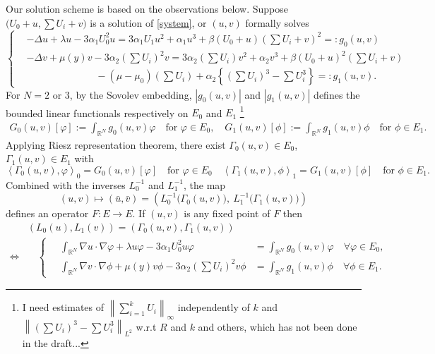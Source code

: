 \documentclass[a4paper,11pt]{article}
\def\red{\color{red}}
\def\red{\color{red}}
\numberwithin{step}{dummy}
\begin{document}
Our solution scheme is based on the observations below. Suppose $\big(U_0 +u, \sum U_i + v\big)$ is a solution of \eqref{system}, or $(u,v)$ formally solves
\begin{equation*}
 \left\{
 \begin{aligned}
 &-\Delta u + \lambda u - 3\alpha_1U_0^2 u = 3\alpha_1U_1 u^2 + \alpha_1u^3 + \beta(U_0+u)\left(\sum U_i +v\right)^2=:g_0(u,v)\\
 &-\Delta v + \mu(y) v - 3\alpha_2\left(\sum U_i\right)^2 v = 3\alpha_2\left(\sum U_i\right)v^2 + \alpha_2v^3 + \beta\left(U_0 +u\right)^2\left(\sum U_i +v\right)  \\
 & \quad \quad \quad \quad \quad \quad \quad - (\mu-\mu_0)\left(\sum U_i\right)+ \alpha_2\left\{ \left(\sum U_i\right)^3 - \sum U_i^3 \right\} =:g_1(u,v).
 \end{aligned}
 \right.
\end{equation*}
For $N=2$ or $3$, by the Sovolev embedding, $|g_0(u,v)|$ and $|g_1(u,v)|$ defines the bounded linear functionals respectively on $E_0$ and $E_1$ \footnote{\red I need estimates of $\displaystyle\left\|\sum_{i=1}^k U_i\right\|_\infty$ independently of $k$ and $\left\| \left(\sum U_i\right)^3 - \sum U_i^3 \right\|_{L^2}$ w.r.t $R$ and $k$ and others, which has not been done in the draft...}
\begin{align*}
 G_0(u,v)[\varphi]:=\int_{ \mathbb{R}^N} g_0(u,v)\varphi \quad \text{for $\varphi \in E_0$}, \quad
 G_1(u,v)[\phi]:=\int_{ \mathbb{R}^N} g_1(u,v)\phi \quad \text{for $\phi \in E_1$}.
\end{align*}
Applying Riesz representation theorem, there exist $\Gamma_0(u,v) \in E_0$, $\Gamma_1(u,v) \in E_1$ with
$$\left<\Gamma_0(u,v),\varphi\right>_0 = G_0(u,v)[\varphi] \quad \text{for $\varphi \in E_0$} \quad \left<\Gamma_1(u,v),\phi\right>_1 = G_1(u,v)[\phi] \quad \text{for $\phi \in E_1$}.$$
Combined with the inverses $L_0^{-1}$ and $L_1^{-1}$, the map
$$(u,v) \mapsto (\bar{u},\bar{v})=\left(L_0^{-1}\Big(\Gamma_0(u,v)\Big), ~L_1^{-1}\Big(\Gamma_1(u,v)\Big)\right)$$
defines an operator $F: E \rightarrow E$. If $(u,v)$ is any fixed point of $F$ then
\begin{align*}
 &\left(L_0(u),L_1(v)\right) = \left(\Gamma_0(u,v),\Gamma_1(u,v)\right)\\
 \Longleftrightarrow &
 \quad\left\{ \quad
 \begin{aligned}
  \int_{\mathbb{R}^N} \nabla u \cdot \nabla \varphi + \lambda u\varphi - 3\alpha_1U_0^2 u\varphi &= \int_{\mathbb{R}^N} g_0(u,v)\varphi \quad \forall \varphi\in E_0,\\
  \int_{\mathbb{R}^N} \nabla v \cdot \nabla \phi + \mu(y) v\phi - 3\alpha_2\left(\sum U_i\right)^2v\phi &= \int_{\mathbb{R}^N} g_1(u,v)\phi \quad \forall \phi \in E_1.
 \end{aligned}
 \right.
\end{align*}
\end{document}
